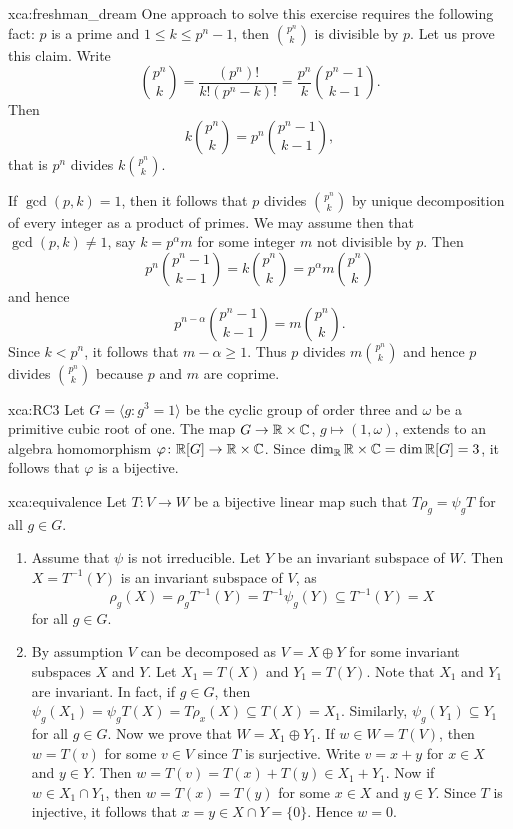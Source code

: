 \begin{sol}{xca:freshman_dream}
    One approach to solve this exercise requires the following fact: 
    $p$ is a prime and $1\leq k\leq p^n-1$, then $\binom{p^n}{k}$ is divisible by $p$.
    Let us prove this claim. Write
    \[
    \binom{p^n}{k}=\frac{(p^n)!}{k!(p^n-k)!}=\frac{p^n}{k}\binom{p^n-1}{k-1}.
    \]
    Then
    \[
    k\binom{p^n}{k}=p^n\binom{p^n-1}{k-1},
    \]
    that is $p^n$ divides $k\binom{p^n}{k}$. 
    
    If $\gcd(p,k)=1$, then it follows that $p$ divides $\binom{p^n}{k}$ by unique decomposition
    of every integer as a product of primes. We may assume then that $\gcd(p,k)\ne1$, 
    say $k=p^\alpha m$ for some integer $m$ not divisible by $p$. Then
    \[
    p^n\binom{p^n-1}{k-1}=k\binom{p^n}{k}=p^{\alpha}m\binom{p^n}{k}
    \]
    and hence 
    \[
    p^{n-\alpha}\binom{p^n-1}{k-1}=m\binom{p^n}{k}.
    \]
    Since $k<p^n$, it follows that
    $m-\alpha\geq 1$. Thus $p$ divides $m\binom{p^n}{k}$ and hence
    $p$ divides $\binom{p^n}{k}$ because $p$ and $m$ are coprime. 
\end{sol}


\begin{sol}{xca:RC3}
Let $G=\langle g:g^3=1\rangle$ be the cyclic group of order three and $\omega$ be a primitive cubic root of one.  
The map $G\to \mathbb{R}\times\mathbb{C}$, $g\mapsto (1,\omega)$, extends to an algebra
homomorphism $\varphi\colon\mathbb{R}[G]\to\mathbb{R}\times\mathbb{C}$. Since 
$\dim_{\mathbb{R}}\mathbb{R}\times\mathbb{C}=\dim\mathbb{R}[G]=3$, it follows that $\varphi$ is a bijective. 
\end{sol}


\begin{sol}{xca:equivalence}
Let $T\colon V\to W$ be a bijective linear map such that $T\rho_g=\psi_gT$ for all $g\in G$. 
\begin{enumerate}
	\item Assume that $\psi$ is not irreducible. Let $Y$ be an invariant subspace of $W$. 
		Then $X=T^{-1}(Y)$ is an invariant subspace of $V$, as 
		\[
		\rho_g(X)=\rho_gT^{-1}(Y)=T^{-1}\psi_g(Y)\subseteq T^{-1}(Y)=X
		\]
		for all $g\in G$. 
	\item By assumption
		$V$ can be decomposed as $V=X\oplus Y$ for some invariant subspaces $X$ and $Y$. Let $X_1=T(X)$ 
		and $Y_1=T(Y)$. 
		Note that $X_1$ and $Y_1$ are invariant. In fact, if $g\in G$, then  
		$\psi_g(X_1)=\psi_g T(X)=T\rho_x(X)\subseteq T(X)=X_1$.
		Similarly, $\psi_g(Y_1)\subseteq Y_1$ 
		for all $g\in G$. Now we prove that $W=X_1\oplus Y_1$. If $w\in W=T(V)$, then 
		$w=T(v)$ for some $v\in V$ since $T$ is surjective. Write $v=x+y$ for $x\in X$ and $y\in Y$. Then 
		$w=T(v)=T(x)+T(y)\in X_1+Y_1$. Now if $w\in X_1\cap Y_1$, then $w=T(x)=T(y)$ for some $x\in X$ and
		$y\in Y$. Since $T$ is injective, it follows that $x=y\in X\cap Y=\{0\}$. Hence $w=0$. 
	\end{enumerate}	
\end{sol}


